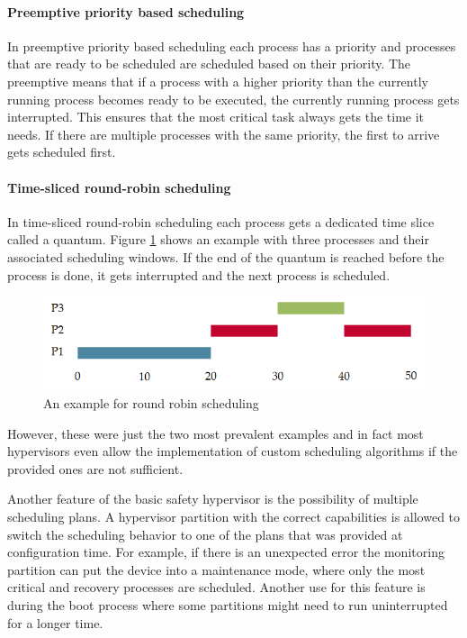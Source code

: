 \paragraph{Preemptive priority based scheduling}
In preemptive priority based scheduling each process has a priority and processes that are ready to be scheduled are scheduled based on their priority.
The preemptive means that if a process with a higher priority than the currently running process becomes ready to be executed, the currently running process gets interrupted. This ensures that the most critical task always gets the time it needs. If there are multiple processes with the same priority, the first to arrive gets scheduled first.

\paragraph{Time-sliced round-robin scheduling}
In time-sliced round-robin scheduling each process gets a dedicated time slice called a quantum. Figure \ref{fig:round_robin_example}  shows an example with three processes and their associated scheduling windows. If the end of the quantum is reached before the process is done, it gets interrupted and the next process is scheduled.
\begin{figure}
\centering
\includegraphics[scale=0.75]{Figures/round_robin_example.png}
\decoRule
\caption{An example for round robin scheduling}
\label{fig:round_robin_example}
\end{figure}

However, these were just the two most prevalent examples and in fact most hypervisors even allow the implementation of custom scheduling algorithms if the provided ones are not sufficient.

Another feature of the basic safety hypervisor is the possibility of multiple scheduling plans. A hypervisor partition with the correct capabilities is allowed to switch the scheduling behavior to one of the plans that was provided at configuration time. For example, if there is an unexpected error the monitoring partition can put the device into a maintenance mode, where only the most critical and recovery processes are scheduled. Another use for this feature is during the boot process where some partitions might need to run uninterrupted for a longer time.

